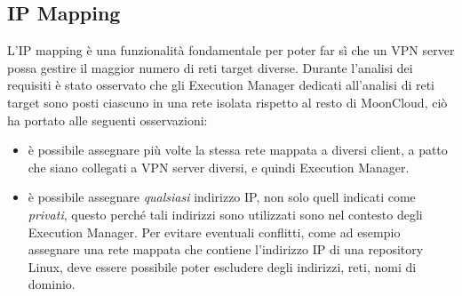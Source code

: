 \subsection{IP Mapping}
L'IP mapping è una funzionalità fondamentale per poter far sì che un VPN server possa
gestire il maggior numero di reti target diverse.
Durante l'analisi dei requisiti è stato osservato che
gli Execution Manager dedicati all'analisi di reti target sono posti
ciascuno in una rete isolata rispetto al resto di MoonCloud, ciò ha portato
alle seguenti osservazioni:
\begin{itemize}
	\item è possibile assegnare più volte la stessa rete mappata a diversi client,
	      a patto che siano collegati a VPN server diversi, e quindi Execution Manager.
	\item è possibile assegnare \textit{qualsiasi} indirizzo IP, non solo quell
	      indicati come \textit{privati}, questo perché tali indirizzi sono utilizzati
	      sono nel contesto degli Execution Manager. Per evitare eventuali conflitti,
	      come ad esempio assegnare una rete mappata che contiene l'indirizzo IP
	      di una repository Linux, deve essere possibile poter escludere degli indirizzi,
	      reti, nomi di dominio.
\end{itemize}

